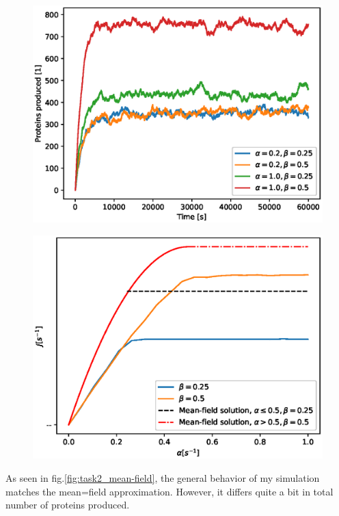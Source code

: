 \documentclass{article}
\begin{document}
\begin{figure}[H]
	\centering
	\includegraphics[width = \linewidth]{figs/task2_prot_prod_v4.eps}
	\label{fig:task2_prot_prod}
\end{figure}

\begin{figure}[H]
	\centering
	\includegraphics[width = \linewidth]{figs/task2_meanfield_v4.eps}
	\label{fig:task2_mean-field}
\end{figure}


As seen in fig.\eqref{fig:task2_mean-field}, the general behavior of my simulation matches the mean=field approximation. However, it differs quite a bit in total number of proteins produced. 
\end{document}
